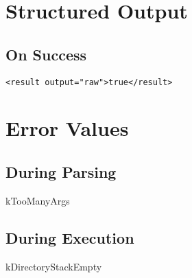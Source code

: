 \documentclass[10pt]{article}
\begin{document}
\section*{ Structured Output }
\subsection*{ On Success }
\begin{verbatim}
<result output="raw">true</result>

\end{verbatim}
\section*{ Error Values }
\subsection*{ During Parsing }


 kTooManyArgs
\subsection*{ During Execution }


 kDirectoryStackEmpty
\end{document}
